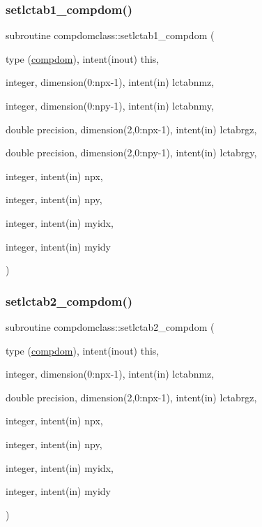 \subsubsection{\texorpdfstring{setlctab1\_compdom()}{setlctab1\_compdom()}}
{\footnotesize\ttfamily subroutine compdomclass\+::setlctab1\+\_\+compdom (\begin{DoxyParamCaption}\item[{type (\mbox{\hyperlink{namespacecompdomclass_structcompdomclass_1_1compdom}{compdom}}), intent(inout)}]{this,  }\item[{integer, dimension(0\+:npx-\/1), intent(in)}]{lctabnmz,  }\item[{integer, dimension(0\+:npy-\/1), intent(in)}]{lctabnmy,  }\item[{double precision, dimension(2,0\+:npx-\/1), intent(in)}]{lctabrgz,  }\item[{double precision, dimension(2,0\+:npy-\/1), intent(in)}]{lctabrgy,  }\item[{integer, intent(in)}]{npx,  }\item[{integer, intent(in)}]{npy,  }\item[{integer, intent(in)}]{myidx,  }\item[{integer, intent(in)}]{myidy }\end{DoxyParamCaption})}

\mbox{\label{namespacecompdomclass_a4bc32865e40fe6b277898a429caff3ca}} 
\subsubsection{\texorpdfstring{setlctab2\_compdom()}{setlctab2\_compdom()}}
{\footnotesize\ttfamily subroutine compdomclass\+::setlctab2\+\_\+compdom (\begin{DoxyParamCaption}\item[{type (\mbox{\hyperlink{namespacecompdomclass_structcompdomclass_1_1compdom}{compdom}}), intent(inout)}]{this,  }\item[{integer, dimension(0\+:npx-\/1), intent(in)}]{lctabnmz,  }\item[{double precision, dimension(2,0\+:npx-\/1), intent(in)}]{lctabrgz,  }\item[{integer, intent(in)}]{npx,  }\item[{integer, intent(in)}]{npy,  }\item[{integer, intent(in)}]{myidx,  }\item[{integer, intent(in)}]{myidy }\end{DoxyParamCaption})}

